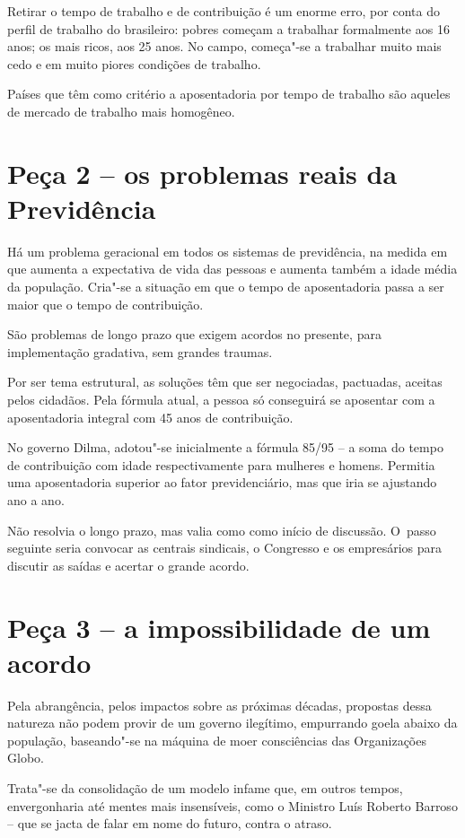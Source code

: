 Retirar o tempo de trabalho e de contribuição é um enorme erro, por
conta do perfil de trabalho do brasileiro: pobres começam a trabalhar
formalmente aos 16 anos; os mais ricos, aos 25 anos. No campo, começa"-se
a trabalhar muito mais cedo e em muito piores condições de trabalho.

Países que têm como critério a aposentadoria por tempo de trabalho são
aqueles de mercado de trabalho mais homogêneo.

\section{Peça 2 -- os problemas reais da Previdência}

Há um problema geracional em todos os sistemas de previdência, na medida
em que aumenta a expectativa de vida das pessoas e aumenta também a
idade média da população. Cria"-se a situação em que o tempo de
aposentadoria passa a ser maior que o tempo de contribuição.

São problemas de longo prazo que exigem acordos no presente, para
implementação gradativa, sem grandes traumas.

Por ser tema estrutural, as soluções têm que ser negociadas, pactuadas,
aceitas pelos cidadãos. Pela fórmula atual, a pessoa só conseguirá se
aposentar com a aposentadoria integral com 45 anos de contribuição.

No governo Dilma, adotou"-se inicialmente a fórmula 85/\allowbreak{}95 -- a soma do
tempo de contribuição com idade respectivamente para mulheres e homens.
Permitia uma aposentadoria superior ao fator previdenciário, mas que
iria se ajustando ano a ano.

Não resolvia o longo prazo, mas valia como como início de discussão. O~passo seguinte seria convocar as centrais sindicais, o Congresso e os
empresários para discutir as saídas e acertar o grande acordo.

\section{Peça 3 -- a impossibilidade de um acordo}

Pela abrangência, pelos impactos sobre as próximas décadas, propostas
dessa natureza não podem provir de um governo ilegítimo, empurrando
goela abaixo da população, baseando"-se na máquina de moer consciências
das Organizações Globo.

Trata"-se da consolidação de um modelo infame que, em outros tempos,
envergonharia até mentes mais insensíveis, como o Ministro Luís Roberto
Barroso -- que se jacta de falar em nome do futuro, contra o atraso.

